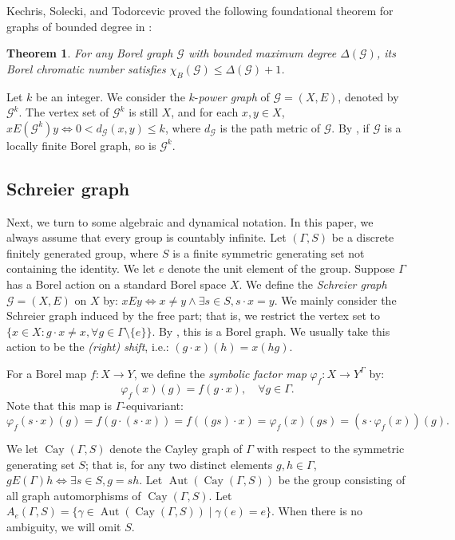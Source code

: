 \documentclass[11pt, reqno, a4paper]{amsart}
\theoremstyle{plain}
\newtheorem{theorem}{Theorem}[section]
\theoremstyle{definition}
\theoremstyle{remark}
\newcommand{\Aut}{\operatorname{Aut}}
\newcommand{\Cay}{\operatorname{Cay}}
\begin{document}
Kechris, Solecki, and Todorcevic proved the following foundational theorem for graphs of bounded degree in \cite[Proposition~4.6]{KST99}:

\begin{theorem}
\label{KST}
For any Borel graph $\mathcal{G}$ with bounded maximum degree $\Delta(\mathcal{G})$, its Borel chromatic number satisfies $\chi_B(\mathcal{G})\le \Delta(\mathcal{G}) + 1$.    
\end{theorem}


Let $k$ be an integer. We consider the $k$-\textit{power graph} of $\mathcal{G}=(X,E)$, denoted by $\mathcal{G}^k$. The vertex set of $\mathcal{G}^k$ is still $X$, and for each $x,y\in X$, $xE(\mathcal{G}^k)y \iff 0<d_{\mathcal{G}}(x,y)\le k$, where $d_{\mathcal{G}}$ is the path metric of $\mathcal{G}$. By \cite[Corollary 5.2]{Pik21}, if $\mathcal{G}$ is a locally finite Borel graph, so is $\mathcal{G}^k$.



\subsection{Schreier graph }
Next, we turn to some algebraic and dynamical notation. In this paper, we always assume that every group is countably infinite. 
 Let $(\Gamma,S)$ be a discrete finitely generated group, where $S$ is a finite symmetric generating set not containing the identity. We let $e$ denote the unit element of the group. Suppose $\Gamma$ has a Borel action on a standard Borel space $X$. We define the \textit{Schreier graph} $\mathcal{G}= (X,E)$ on $X$ by:
$ x E y \iff x\ne y \wedge\exists s\in S, s\cdot x=y. $ We mainly consider the Schreier graph induced by the free part; that is, we restrict the vertex set to $\{x\in X:g\cdot x\ne x, \forall g\in\Gamma\setminus\{e\}\}$. By \cite[Lemma 4.4]{Pik21}, this is a Borel graph. We usually take this action to be the \textit{(right) shift}, i.e.:
$ (g \cdot x)(h) = x(hg)$.

For a Borel map $f: X \longrightarrow Y$, we define the \textit{symbolic factor map} $\varphi_f: X \longrightarrow Y^\Gamma$ by:
\[ \varphi_f(x)(g) = f(g \cdot x), \quad \forall g \in \Gamma. \]
Note that this map is  $\Gamma$-equivariant: 
\[ \varphi_f(s \cdot x)(g)=f(g \cdot (s\cdot x))=f((gs)\cdot x)=\varphi_f(x)(gs)=(s \cdot \varphi_f(x))(g). \]

We let $\Cay(\Gamma, S)$ denote the  Cayley graph of $\Gamma$ with respect to the symmetric generating set $S$; that is, for any two distinct elements $g,h\in \Gamma$, $gE(\Gamma)h\iff \exists s\in S, g=sh$. Let $\Aut(\Cay(\Gamma, S))$ be the group consisting of all graph automorphisms of $\Cay(\Gamma, S)$. Let $A_e(\Gamma,S)= \{ \gamma \in \Aut(\Cay(\Gamma, S))\mid \gamma(e)=e\}$. When there is no ambiguity, we will omit $S$.
\end{document}
